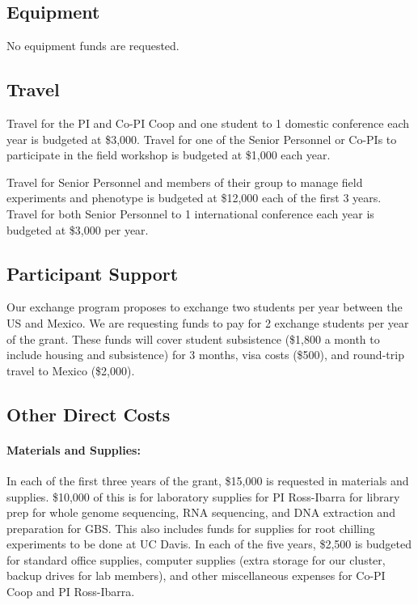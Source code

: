 \subsection*{Equipment}

No equipment funds are requested.

\subsection*{Travel}

Travel for the PI and Co-PI Coop and one student to 1 domestic conference each year is budgeted at \$3,000.  Travel for one of the Senior Personnel or Co-PIs to participate in the field workshop is budgeted at \$1,000 each year.

Travel for Senior Personnel and members of their group to manage field experiments and phenotype is budgeted at \$12,000 each of the first 3 years. Travel for both Senior Personnel to 1 international conference each year is budgeted at \$3,000 per year.

\subsection*{Participant Support}
Our exchange program proposes to exchange two students per year between the US and Mexico.  We are requesting funds to pay for 2 exchange students per year of the grant. These funds will cover student subsistence (\$1,800 a month to include housing and subsistence) for 3 months, visa costs (\$500), and round-trip travel to Mexico (\$2,000).

\subsection*{Other Direct Costs}

 \paragraph{Materials and Supplies:}
In each of the first three years of the grant, \$15,000 is requested in materials and supplies.  \$10,000 of this is for laboratory supplies for PI Ross-Ibarra for library prep for whole genome sequencing, RNA sequencing, and DNA extraction and preparation for GBS.  This also includes funds for supplies for root chilling experiments to be done at UC Davis.  In each of the five years, \$2,500 is budgeted for standard office supplies, computer supplies (extra storage for our cluster, backup drives for lab members), and other miscellaneous expenses for Co-PI Coop and PI Ross-Ibarra. 

